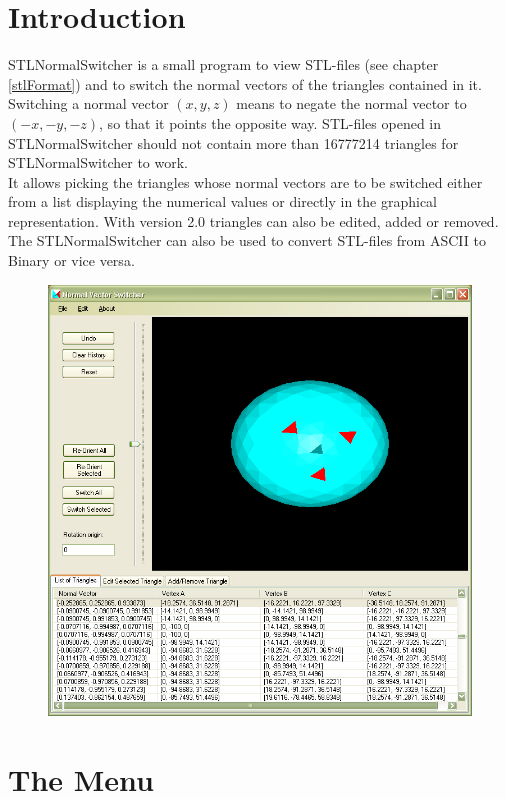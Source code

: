 \chapter{Introduction}

STLNormalSwitcher is a small program to view STL-files (see chapter \ref{stlFormat}) and to switch the normal vectors of the triangles contained in it. Switching a normal vector $(x,y,z)$ means to negate the normal vector to $(-x,-y,-z)$, so that it points the opposite way. STL-files opened in STLNormalSwitcher should not contain more than 16777214 triangles for STLNormalSwitcher to work.\\

\noindent
It allows picking the triangles whose normal vectors are to be switched either from a list displaying the numerical values or directly in the graphical representation. With version 2.0 triangles can also be edited, added or removed.\\

\noindent
The STLNormalSwitcher can also be used to convert STL-files from ASCII to Binary or vice versa.

\enlargethispage{3\baselineskip}
\begin{figure}[hb]
	\centering
	\includegraphics[width=0.81\linewidth]{window1}
\end{figure}


\chapter{The Menu}

